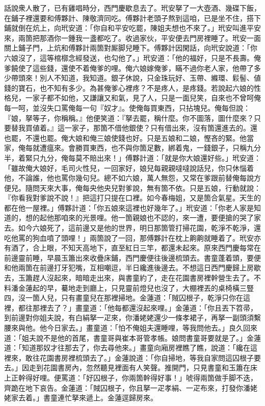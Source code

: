 話說衆人散了，已有雞唱時分，西門慶歇息去了。玳安拏了一大壺酒、幾碟下飯，在鋪子裡還要和傅夥計、陳敬濟同吃。傅夥計老頭子熬到這咱，已是坐不住，搭下鋪就倒在炕上，向玳安道：「你自和平安吃罷，陳姐夫想也不來了。」玳安叫進平安來，兩箇把那酒你一鍾我一盞都吃了。收過家伙，平安便去門房裡睡了。玳安一面關上鋪子門，上炕和傅夥計兩箇對厮脚兒睡下。傅夥計因閑話，向玳安說道：「你六娘沒了，這等棺槨念經發送，也勾他了。」玳安道：「他的福好，只是不長壽。俺爹饒使了這些錢，還使不着俺爹的哩。俺六娘嫁俺爹，瞞不過你老人家，他帶了多少帶頭來！別人不知道，我知道。銀子休說，只金珠玩好、玉帶、縧環、鬏髻、値錢的寶石，也不知有多少。為甚俺爹心裡疼？不是疼人，是疼錢。{}若說起六娘的性格兒，一家子都不如他，又謙讓又和氣，見了人，只是一面兒笑，自來也不曾呵俺每一呵，並沒失口罵俺每一句『奴才』。使俺每買東西，只拈塊兒。俺每但說：『娘，拏等子，你稱稱。』他便笑道：『拏去罷，稱什麼。你不圖落，圖什麼來？只要替我買値着。』這一家子，那箇不借他銀使？只有借出來，沒有箇還進去的。還也罷，不還也罷。俺大娘和俺三娘使錢也好。只是五娘和二娘，慳吝的緊。他當家，俺每就遭瘟來。會勝買東西，也不與你箇足數，綁着鬼，一錢銀子，只稱九分半，着緊只九分，俺每莫不賠出來！」{}傅夥計道：「就是你大娘還好些。」玳安道：「雖故俺大娘好，毛司火性兒，一回家好，娘兒每親親噠噠說話兒，你只休惱着他，不論誰，他也罵你幾句兒。{}總不如六娘，萬人無怨，又常在爹跟前替俺每說方便兒。隨問天來大事，俺每央他央兒對爹說，無有箇不依。只是五娘，行動就說：『你看我對爹說不說！』把這打只提在口裡。如今春梅姐，又是箇合氣星。天生的都在他一屋裡。」{}傅夥計道：「你五娘來這裡也好幾年了。」玳安道：「你老人家是知道的，想的起他那咱來的光景哩。{}他一箇親娘也不認的，來一遭，要便搶的哭了家去。{}如今六娘死了，這前邊又是他的世界，明日那箇管打掃花園，乾淨不乾淨，還吃他罵的狗血噴了頭哩！」兩箇說了一回，那傅夥計在枕上齁齁就睡着了。{}玳安亦有酒了，合上眼，不知天高地下，直至紅日三竿，都還未起來。原來西門慶每常在前邊靈前睡，早晨玉簫出來收疊床鋪，西門慶便往後邊梳頭去。書童蓬着頭，要便和他兩箇在前邊打牙犯嘴，互相嘲逗，半日纔進後邊去。不想這日西門慶歸上房歇去，玉簫趕人沒起來，暗暗走出來，與書童約了，走在花園書房裡幹營生去了。不料潘金蓮起的早，驀地走到廳上，只見靈前燈兒也沒了，大棚裡丟的桌椅橫三豎四，沒一箇人兒，{}只有畫童兒在那裡掃地。金蓮道：「賊囚根子，乾淨只你在這裡，都往那裡去了？」畫童道：「他每都還沒起來哩。」金蓮道：「你且丟下笤帚，到前邊對你姐夫說，有白絹拏一疋來，你潘姥姥還少一條孝裙子，再拏一副頭須繫腰來與他。他今日家去。」畫童道：「怕不俺姐夫還睡哩，等我問他去。」良久回來道：「姐夫說不是他的首尾，書童哥與崔本哥管孝帳。娘問書童哥要就是了。」金蓮道：「知道那奴才往那去了，你去尋他來。」畫童向廂房裡瞧了瞧，{}說道：「纔在這裡來，敢往花園書房裡梳頭去了。」金蓮說道：「你自掃地，等我自家問這囚根子要去。」因走到花園書房內，忽然聽見裡面有人笑聲。推開門，只見書童和玉簫在床上正幹得好哩。便罵道：「好囚根子，你兩箇幹得好事！」唬得兩箇做手脚不迭，齊跪在地下哀告。金蓮道：「賊囚根子，你且拏一疋孝絹、一疋布來，打發你潘姥姥家去着。」書童連忙拏來遞上。金蓮逕歸房來。

